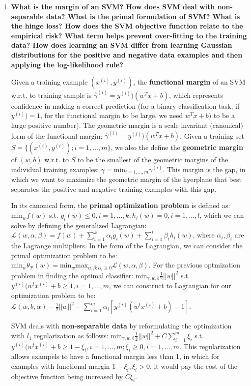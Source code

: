 \documentclass[10pt,onecolumn,letterpaper]{article}
\begin{document}
\begin{enumerate}

\item  \textbf{What is the margin of an SVM? How does SVM deal with non-separable data? What is the primal formulation of SVM? What is the hinge loss? How does the SVM objective function relate to the empirical risk? What term helps prevent over-fitting to the training data? How does learning an SVM differ from learning Gaussian distributions for the positive and negative data examples and then applying the log-likelihood rule?}

Given a training example $(x^{(i)}, y^{(i)})$, the \textbf{functional margin} of an SVM w.r.t. to training sample is $\widehat{\gamma}^{(i)} = y^{(i)})(w^Tx+b)$, which represents confidence in making a correct prediction (for a binary classification task, if $y^{(i)}) = 1$, for the functional margin to be large, we need $w^Tx+b)$ to be a large positive number). The geometric margin is a scale invariant (canonical) form of the functional margin: $\widehat{\gamma}^{(i)} = y^{(i)})(w^Tx+b)$. Given a training set $ S = \{(x^{(i)}, y^{(i)}); i=1,\dots,m\}$, we also the define the \textbf{geometric margin} of $(w,b)$ w.r.t. to $S$ to be the smallest of the geometric margins of the individual training examples: $\gamma = \text{min}_{i=1,\dots,m} \gamma^{(i)}$. This margin is the gap, in which we want to maximize the geometric margin of the hyerplane that best separates the positive and negative training examples with this gap. 

In its canonical form, the \textbf{primal optimization problem} is defined as: $\text{min}_w f(w)$ s.t. $g_i(w) \leq 0, i=1,\dots,k; h_i(w)=0, i=1,\dots,l$, which we can solve by defining the generalized Lagrangian: $\mathcal{L}(w,\alpha, \beta) = f(w) + \sum_{i=1}^k \alpha_ig_i(w)+\sum_{i=1}^l\beta_ih_i(w)$, where $\alpha_i,\beta_i$ are the Lagrange multipliers. In the form of the Lagrangian, we can consider the primal optimization problem to be: $\text{min}_w\theta_{\mathcal{P}}(w) = \text{min}_w \text{max}_{\alpha,\beta:\alpha_i \geq 0} \mathcal{L}(w,\alpha,\beta)$. For the previous optmization problem in finding the optimal classifier: $\text{min}_{\gamma,w,b} \frac{1}{2}||w||^2$ s.t. $y^{(i)}(w^tx^{(i)}+b \geq 1, i=1,\dots,m$, we can construct to Lagrangian for our optimization problem to be: $\mathcal{L}(w,b,\alpha) -\frac{1}{2}||w||^2 - \sum_{i=1}^m \alpha_i[y^{(i)}(w^tx^{(i)}+b)-1]$.

SVM deals with \textbf{non-separable data} by reformulating the optimization with $l_1$ regularization as follows: $\text{min}_{\gamma,w,b} \frac{1}{2}||w||^2 + C \sum^m_{i=1}\xi_i$ s.t. $y^{(i)}(w^tx^{(i)}+b \geq 1 - \xi_i, i=1,\dots,m; \xi_i \geq 0, i=1,\dots,m$. This regularization allows exampels to have a functional margin less than 1, in which for examples with functional margin $1-\xi_i, \xi_i > 0$, it would pay the cost of the objective function being increased by $C\xi_i$.


\end{enumerate}
\end{document}
